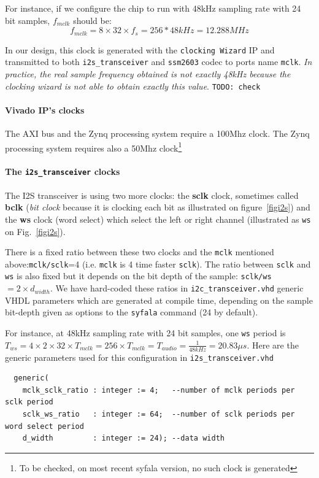 \documentclass[11pt]{article}
\numberwithin{equation}{section}
\numberwithin{figure}{section}
\newcommand{\todo}[1]{\footnote{#1}}
\begin{document}
For instance, if  we configure the chip to run with 48kHz sampling rate with 24 bit samples, $f_{mclk}$ should be: $$f_{mclk}=8 \times 32 \times f_s=256*48kHz =12.288MHz$$

In our design, this clock is generated with the {\tt clocking Wizard} IP and transmitted to both {\tt i2s\_transceiver} and {\tt ssm2603}  codec to ports name {\tt mclk}. {\em In practice, the real sample frequency obtained is not exactly 48kHz because the clocking wizard is not able to obtain exactly this value}. {\tt TODO: check}

\paragraph{Vivado IP's clocks}
The AXI bus and the Zynq processing system require a 100Mhz clock. The Zynq processing system requires also a 50Mhz clock\todo{To be checked, on most recent syfala version, no such clock is generated}


\paragraph{The {\tt i2s\_transceiver} clocks}
The I2S transceiver is using two more clocks: the {\bf sclk} clock, sometimes called  {\bf bclk} ({\em bit clock} because it is clocking each bit as illustrated on figure~\ref{figi2s}) and the {\bf ws} clock (word select) which select the left or right channel (illustrated as {\tt ws} on Fig.~\ref{figi2s}).

There is a fixed ratio between these two clocks and the {\tt mclk} mentioned above:{\tt mclk/sclk}=4 (i.e. {\tt mclk} is 4 time faster {\tt sclk}). The ratio between {\tt sclk} and {\tt ws} is also fixed but it depends on the bit depth of the sample: {\tt sclk/ws}$=2\times d_{width}$. We have hard-coded these ratios  in {\tt i2c\_transceiver.vhd} generic VHDL parameters which are generated at compile time, depending on the sample bit-depth given as options to the {\tt syfala} command (24 by default).

For instance, at  48kHz sampling rate with 24 bit samples,  one {\tt ws} period is $T_{ws}=4\times 2\times 32\times T_{mclk}=256\times T_{mclk}=T_{audio}=\frac{1}{48kHz}=20.83\mu s$. Here are the generic parameters used for this configuration in {\tt i2s\_transceiver.vhd}

{\small
\begin{verbatim}
  generic(
    mclk_sclk_ratio : integer := 4;   --number of mclk periods per sclk period
    sclk_ws_ratio   : integer := 64;  --number of sclk periods per word select period
    d_width         : integer := 24); --data width
\end{verbatim}
}
\end{document}

